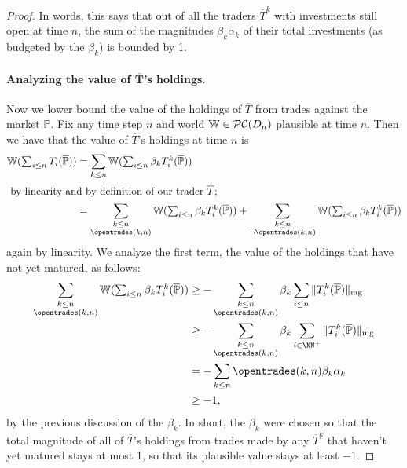 \documentclass[authordate,onecolumn,noenvironments]{miri-tech-article}
\numberwithin{equation}{subsection}
\newcommand{\seq}[1]{{\overline{#1}}}
\newcommand{\nn}{n}
\newcommand{\trade}{T}%
\newcommand{\Trader}{\seq{\trade}} %
\newcommand{\magnit}[1]{{\|#1\|_{\rm mg}}} %
\newcommand{\BelState}{\mathbb{P}}
\newcommand{\pt}{\BelState}
\newcommand{\MP}{\seq{\pt}}
\newcommand{\ftn}{(\MP)} %
\newcommand{\dt}{D}
\newcommand{\pcworlds}{\mathcal{P\-C}}
\newcommand{\World}{\mathbb{W}}
\begin{document}
\begin{proof}
In words, this says that out of all the traders $\Trader^k$ with investments still open at time $n$, the sum of the magnitudes  $\beta_k \alpha_k$ of
their total investments (as budgeted by the $\beta_k$) is bounded by 1. 

\paragraph{Analyzing the value of $\bm{\Trader}$'s holdings.}

Now we lower bound the value of the holdings of $\Trader$ from trades against the market $\MP$. Fix any time step $n$ and world $\World\in\pcworlds(\dt_\nn)$ plausible
at time $n$. Then we have that the value of $\Trader$'s holdings at time $n$ is
%
\begin{align*}
  \World( {\textstyle \sum_{i \leq n} \trade_i(\MP) }) 
&= \sum_{k\leq n}   \World( {\textstyle \sum_{i \leq n} \beta_k \trade^k_i(\MP) })\\
%
\shortintertext{ by linearity and by definition of our trader $\Trader$;}
%
&= \sum_{\substack{k\leq n\\  \opentrades(k,n)}}   \World( {\textstyle \sum_{i \leq n} \beta_k \trade^k_i(\MP) }) 
+  \sum_{\substack{k\leq n\\  \lnot \opentrades(k,n)}}   \World( {\textstyle \sum_{i \leq n} \beta_k \trade^k_i(\MP) }) 
\end{align*}
%
again by linearity. We analyze the first term, the value of the holdings that have not yet matured, as follows:
%
\begin{align*}
 \sum_{\substack{k\leq n\\  \opentrades(k,n)}}   \World( {\textstyle \sum_{i \leq n} \beta_k \trade^k_i(\MP) }) 
 &\geq -\sum_{\substack{k\leq n\\  \opentrades(k,n)}}   \beta_k \sum_{i \leq n} \magnit{\trade^k_i \ftn}
 \\
 &\geq -\sum_{\substack{k\leq n\\  \opentrades(k,n)}}   \beta_k \sum_{i \in \NN^+} \magnit{\trade^k_i \ftn}
 \\
 &= -\sum_{k\leq n  }  \opentrades(k,n) \beta_k \alpha_k \\ 
 &\geq -1 ,
\end{align*}
%
by the previous discussion of the $\beta_k$. In short, the $\beta_k$ were chosen so that the total magnitude of all of $\Trader$'s holdings  from trades made
by any $\Trader^k$ that haven't yet matured stays at most 1, so that its plausible value stays at least $-1$. 


\end{proof}
\end{document}
